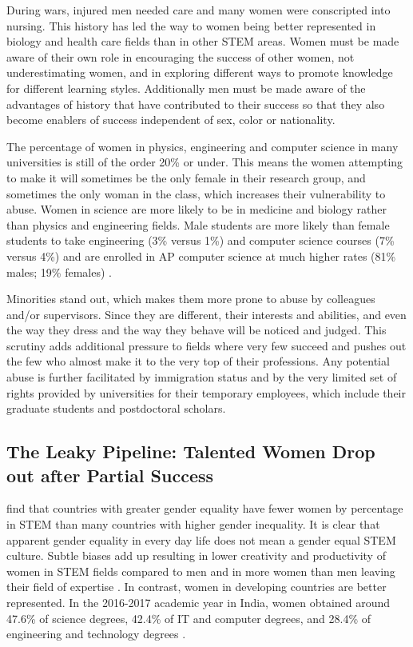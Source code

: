 \documentclass[utf8]{frontiersSCNS} %
\begin{document}
During wars, injured men needed care and many women were conscripted into nursing. This history has led the way to women being better represented in biology and health care fields than in other STEM areas. Women must be made aware of their own role in encouraging the success of other women, not underestimating women, and in exploring different ways to promote knowledge for different learning styles. Additionally men must be made aware of the advantages of history that have contributed to their success so that they also become enablers of success independent of sex, color or nationality.

The percentage of women in physics, engineering and computer science in many universities is still of the order 20\% or under. This means the women attempting to make it will sometimes be the only female in their research group, and sometimes the only woman in the class, which increases their vulnerability to abuse. Women in science are more likely to be in medicine and biology rather than physics and engineering fields. Male students are more likely than female students to take engineering (3\% versus 1\%) and computer science courses (7\% versus 4\%) and are enrolled in AP computer science at much higher rates (81\% males; 19\% females) \citep{NGC}. %

Minorities stand out, which makes them more prone to abuse by colleagues and/or supervisors. Since they are different, their interests and abilities, and even the way they dress and the way they behave will be noticed and judged. This scrutiny adds additional pressure to fields where very few succeed and pushes out the few who almost make it to the very top of their professions. Any potential abuse is further facilitated by immigration status and by the very limited set of rights provided by universities for their temporary employees, which include their graduate students and postdoctoral scholars. 

\subsection{The Leaky Pipeline: Talented Women Drop out after Partial Success}
\label{leaky}
\cite{stoet2018gender} find that countries with greater gender equality have fewer women by percentage in STEM than many countries with higher gender inequality. It is clear that apparent gender equality in every day life does not mean a gender equal STEM culture.  Subtle biases add up resulting in lower creativity and productivity of women in STEM fields compared to  men and in more women than men leaving their field of expertise \citep{2018Report}. In contrast, women in developing countries are better represented. In the 2016-2017 academic year in India, women obtained around 47.6\% of science degrees, 42.4\% of IT and computer degrees, and 28.4\% of engineering and technology degrees \citep{India2017}. 
\end{document}
